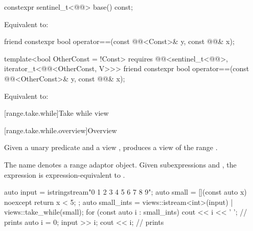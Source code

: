 %
\begin{itemdecl}
constexpr sentinel_t<@@> base() const;
\end{itemdecl}

\begin{itemdescr}
\pnum
\effects
Equivalent to: 
\end{itemdescr}

%
\begin{itemdecl}
friend constexpr bool operator==(const @@<Const>& y, const @@& x);

template<bool OtherConst = !Const>
  requires @@<sentinel_t<@@>, iterator_t<@@<OtherConst, V>>>
friend constexpr bool operator==(const @@<OtherConst>& y, const @@& x);
\end{itemdecl}

\begin{itemdescr}
\pnum
\effects
Equivalent to:
\end{itemdescr}

[range.take.while]{Take while view}

[range.take.while.overview]{Overview}

\pnum
Given a unary predicate  and a view ,
 produces a view
of the range .

%
\pnum
{}%
The name  denotes
a range adaptor object.
Given subexpressions  and ,
the expression 
is expression-equivalent to .

\pnum
\begin{example}
\begin{codeblock}
auto input = istringstream{"0 1 2 3 4 5 6 7 8 9"};
auto small = [](const auto x) noexcept { return x < 5; };
auto small_ints = views::istream<int>(input) | views::take_while(small);
for (const auto i : small_ints) {
  cout << i << ' ';                             // prints 
}
auto i = 0;
input >> i;
cout << i;                                      // prints 
\end{codeblock}
\end{example}

